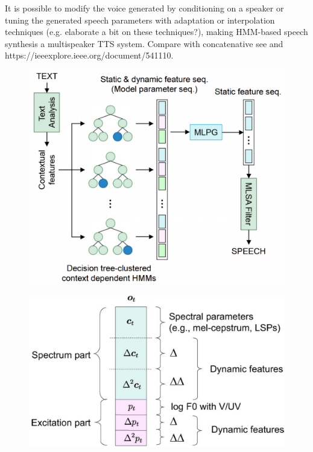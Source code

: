 \documentclass[a4paper, oneside]{article}
\begin{document}
It is possible to modify the voice generated by conditioning on a speaker or tuning the generated speech parameters with adaptation or interpolation techniques (e.g. \cite{HMMSpeakerInterpolation}  \color{red} elaborate a bit on these techniques?\color{black}), making HMM-based speech synthesis a multispeaker TTS system. \color{red} Compare with concatenative see \cite{SPSSDNN} and https://ieeexplore.ieee.org/document/541110.\color{black}

\begin{figure}[h]
	\centering
	\begin{minipage}{.45\linewidth}
		\centering
		\includegraphics[width=\linewidth]{images/hmm_spss.png}
		\label{hmm_spss_framework}
	\end{minipage}
	\hspace{.05\linewidth}
	\begin{minipage}{.45\linewidth}
		\centering
		\includegraphics[width=\linewidth]{images/mlpg_features.png}
		\label{mlpg_features}
	\end{minipage}
\end{figure}
\end{document}
